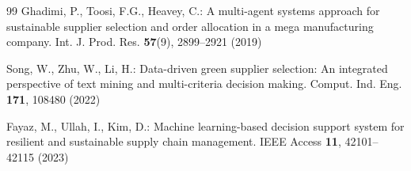 \documentclass[twocolumn,10pt]{article}
\begin{document}
\begin{thebibliography}{99}
Ghadimi, P., Toosi, F.G., Heavey, C.: A multi-agent systems approach for sustainable supplier selection and order allocation in a mega manufacturing company. Int. J. Prod. Res. \textbf{57}(9), 2899--2921 (2019)

Song, W., Zhu, W., Li, H.: Data-driven green supplier selection: An integrated perspective of text mining and multi-criteria decision making. Comput. Ind. Eng. \textbf{171}, 108480 (2022)

Fayaz, M., Ullah, I., Kim, D.: Machine learning-based decision support system for resilient and sustainable supply chain management. IEEE Access \textbf{11}, 42101--42115 (2023)

\end{thebibliography}
\end{document}
